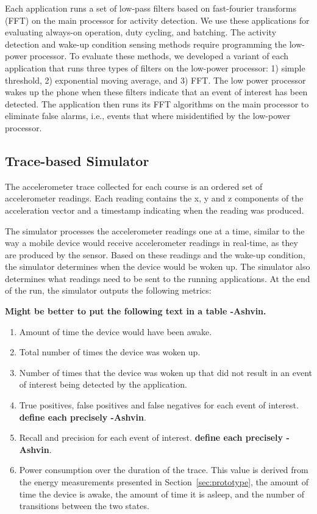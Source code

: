 Each application runs a set of low-pass filters based on fast-fourier
transforms (FFT) on the main processor for activity detection. We use
these applications for evaluating always-on operation, duty cycling,
and batching. The activity detection and wake-up condition sensing
methods require programming the low-power processor. To evaluate these
methods, we developed a variant of each application that runs three
types of filters on the low-power processor: 1) simple threshold, 2)
exponential moving average, and 3) FFT. The low power processor wakes
up the phone when these filters indicate that an event of interest has
been detected. The application then runs its FFT algorithms on the
main processor to eliminate false alarms, i.e., events that where
misidentified by the low-power processor.

\subsection{Trace-based Simulator}

The accelerometer trace collected for each course is an ordered set of
accelerometer readings. Each reading contains the x, y and z
components of the acceleration vector and a timestamp indicating when
the reading was produced.

The simulator processes the accelerometer readings one at a time,
similar to the way a mobile device would receive accelerometer
readings in real-time, as they are produced by the sensor. Based on
these readings and the wake-up condition, the simulator determines
when the device would be woken up. The simulator also determines what
readings need to be sent to the running applications. At the end of
the run, the simulator outputs the following metrics:

\textbf{Might be better to put the following text in a table -Ashvin.}

\begin{enumerate}
\setlength{\itemsep}{-3pt}  

\item Amount of time the device would have been awake.

\item Total number of times the device was woken up.

\item Number of times that the device was woken up that did not result
  in an event of interest being detected by the application.

\item True positives, false positives and false negatives for each
  event of interest. \textbf{define each precisely -Ashvin}.

\item Recall and precision for each event of interest. \textbf{define
  each precisely -Ashvin}.

\item Power consumption over the duration of the trace. This value is
  derived from the energy measurements presented in
  Section~\ref{sec:prototype}, the amount of time the device is awake,
  the amount of time it is asleep, and the number of transitions
  between the two states.
\end{enumerate}


